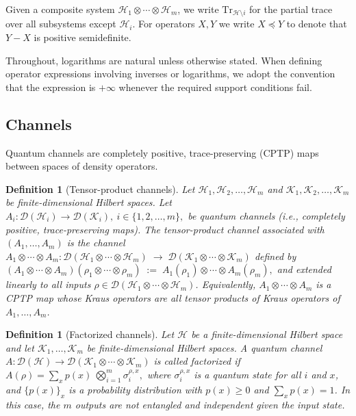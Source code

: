 \documentclass[11pt]{article}
\theoremstyle{plain}
\newtheorem{definition}[theo]{Definition}
\theoremstyle{remark}
\begin{document}
Given a composite system $\mathcal{H}_1 \otimes \cdots \otimes \mathcal{H}_m$, we write
$\mathrm{Tr}_{\mathcal{H}\setminus i}$ for the partial trace over all subsystems except $\mathcal{H}_i$.
For operators $X,Y$ we write $X \preceq Y$ to denote that $Y-X$ is positive semidefinite.

Throughout, logarithms are natural unless otherwise stated.
When defining operator expressions involving inverses or logarithms, we adopt the convention that the expression is $+\infty$ whenever the required support conditions fail.


\subsection{Channels}

Quantum channels are completely positive, trace-preserving (CPTP) maps between spaces of density operators.


\begin{definition}[Tensor-product channels]
Let $\mathcal{H}_1,\mathcal{H}_2, \ldots, \mathcal{H}_m$ and $\mathcal{K}_1,\mathcal{K}_2, \ldots, \mathcal{K}_m$ be finite-dimensional Hilbert
spaces. Let
$
A_i:\mathcal{D}(\mathcal{H}_i)\to\mathcal{D}(\mathcal{K}_i), \ i\in\{1,2, \ldots,m\},
$
be quantum channels (i.e., completely positive, trace-preserving maps).
The \emph{tensor-product channel} associated with $(A_1, \ldots, A_m)$ is the channel
$
A_1 \otimes \cdots \otimes A_m:\mathcal{D}(\mathcal{H}_1\otimes\cdots\otimes\mathcal{H}_m)
\;\longrightarrow\;
\mathcal{D}(\mathcal{K}_1\otimes\cdots\otimes\mathcal{K}_m)$
defined by
$
(A_1 \otimes \cdots \otimes A_m)(\rho_1\otimes\cdots\otimes\rho_m)
\;:=\;
A_1(\rho_1)\otimes\cdots\otimes A_m(\rho_m),$
and extended linearly to all inputs $\rho\in\mathcal{D}(\mathcal{H}_1\otimes\cdots\otimes\mathcal{H}_m)$.
{Equivalently, $A_1\otimes\cdots \otimes A_m$ is a CPTP map whose Kraus operators are all tensor products
of Kraus operators of $A_1, \ldots, A_m$.}

\end{definition}

\begin{definition}[Factorized channels]
Let $\mathcal{H}$ be a finite-dimensional Hilbert space and let
$\mathcal{K}_1,\ldots,\mathcal{K}_m$ be finite-dimensional Hilbert spaces.
A quantum channel
$
A:\mathcal{D}(\mathcal{H})\to \mathcal{D}(\mathcal{K}_1\otimes\cdots\otimes\mathcal{K}_m)
$
is called \emph{factorized} if 
{
$
A(\rho) =\sum_{x} p(x) \ \bigotimes_{i=1}^m \sigma_i^{\rho,x},
 $
where $\sigma_i^{\rho,x}$ is a quantum state for all $i$ and $x$, and $\{p(x)\}_x$ is a probability distribution with $p(x) \geq 0$ and $\sum_x p(x)= 1$.
In this case, the $m$ outputs are not entangled and 
independent given the input state. }
\end{definition}
\end{document}
